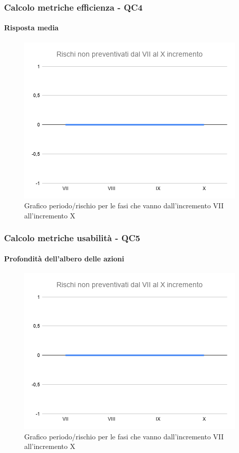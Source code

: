 \subsubsection{Calcolo metriche efficienza - QC4}
\paragraph{Risposta media}
\begin{figure}[H]
			\centering%
			\includegraphics[width=0.8\linewidth]{./res/images/RischiNonPreven_4.png}
			\caption{Grafico periodo/rischio per le fasi che vanno dall'incremento VII all'incremento X}
			\label{fig:Grafico periodo/rischio per le fasi che vanno dall'incremento VII all'incremento X}
	\end{figure}

\subsubsection{Calcolo metriche usabilità - QC5}
\paragraph{Profondità dell’albero delle azioni}
\begin{figure}[H]
			\centering%
			\includegraphics[width=0.8\linewidth]{./res/images/RischiNonPreven_4.png}
			\caption{Grafico periodo/rischio per le fasi che vanno dall'incremento VII all'incremento X}
			\label{fig:Grafico periodo/rischio per le fasi che vanno dall'incremento VII all'incremento X}
	\end{figure}
